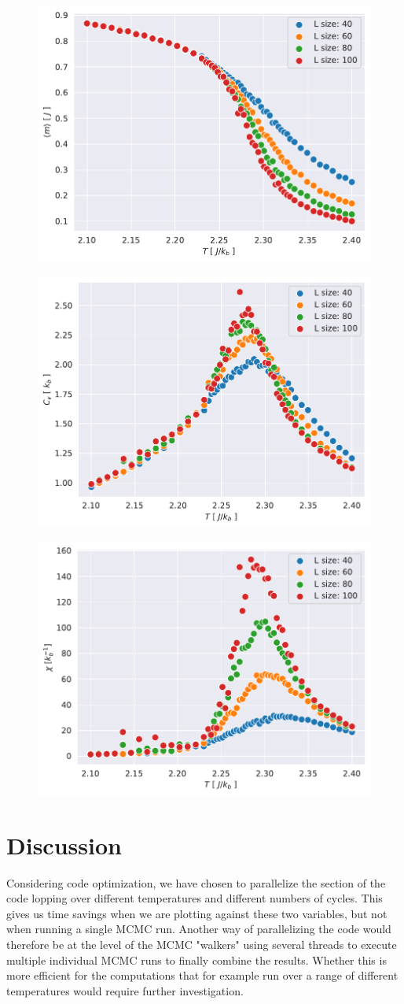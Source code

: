 \documentclass[english,notitlepage,reprint,nofootinbib]{revtex4-1}  %
\begin{document}
\begin{figure}[H]
    \centering
    \includegraphics[width=.5\textwidth]{../figures/L_size_m_T.pdf}
    \caption{}
    \label{fig:}
\end{figure}

\begin{figure}[H]
    \centering
    \includegraphics[width=.5\textwidth]{../figures/L_size_c_v_T.pdf}
    \caption{}
    \label{fig:}
\end{figure}

\begin{figure}[H]
    \centering
    \includegraphics[width=.5\textwidth]{../figures/L_size_X_T.pdf}
    \caption{}
    \label{fig:}
\end{figure}
\twocolumngrid
\section{Discussion}\label{sec:discussion}
%
Considering code optimization, we have chosen to parallelize the section of the code lopping over different temperatures and different numbers of cycles. This gives us time savings when we are plotting against these two variables, but not when running a single MCMC run. Another way of parallelizing the code would therefore be at the level of the MCMC "walkers" using several threads to execute multiple individual MCMC runs to finally combine the results. Whether this is more efficient for the computations that for example run over a range of different temperatures would require further investigation. 
\end{document}
